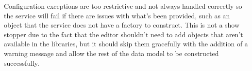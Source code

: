     Configuration exceptions are too restrictive and not always handled
    correctly so the service will fail if there are issues with what's been
    provided, such as an object that the service does not have a factory to
    construct. This is not a show stopper due to the fact that the editor
    shouldn't need to add objects that aren't available in the libraries, but
    it should skip them gracefully with the addition of a warning message and
    allow the rest of the data model to be constructed successfully.
